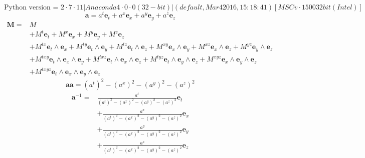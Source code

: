 \documentclass[10pt,fleqn]{report}
\begin{document}
\begin{equation*} \mbox{Python version = } 2 \cdot 7 \cdot 11 |Anaconda 4 \cdot 0 \cdot 0 (32-bit)| (default, Mar  4 2016, 15:18:41) [MSC v \cdot 1500 32 bit (Intel)] \end{equation*}
\begin{equation*} \bm{a} =  a^{t}  \boldsymbol{e}_{t} + a^{x}  \boldsymbol{e}_{x} + a^{y}  \boldsymbol{e}_{y} + a^{z}  \boldsymbol{e}_{z} \end{equation*}
  \begin{align*} \bm{M} =  & M   \\  &  + M^{t}  \boldsymbol{e}_{t} + M^{x}  \boldsymbol{e}_{x} + M^{y}  \boldsymbol{e}_{y} + M^{z}  \boldsymbol{e}_{z} \\  &  + M^{tx}  \boldsymbol{e}_{t}\wedge \boldsymbol{e}_{x} + M^{ty}  \boldsymbol{e}_{t}\wedge \boldsymbol{e}_{y} + M^{tz}  \boldsymbol{e}_{t}\wedge \boldsymbol{e}_{z} + M^{xy}  \boldsymbol{e}_{x}\wedge \boldsymbol{e}_{y} + M^{xz}  \boldsymbol{e}_{x}\wedge \boldsymbol{e}_{z} + M^{yz}  \boldsymbol{e}_{y}\wedge \boldsymbol{e}_{z} \\  &  + M^{txy}  \boldsymbol{e}_{t}\wedge \boldsymbol{e}_{x}\wedge \boldsymbol{e}_{y} + M^{txz}  \boldsymbol{e}_{t}\wedge \boldsymbol{e}_{x}\wedge \boldsymbol{e}_{z} + M^{tyz}  \boldsymbol{e}_{t}\wedge \boldsymbol{e}_{y}\wedge \boldsymbol{e}_{z} + M^{xyz}  \boldsymbol{e}_{x}\wedge \boldsymbol{e}_{y}\wedge \boldsymbol{e}_{z} \\  &  + M^{txyz}  \boldsymbol{e}_{t}\wedge \boldsymbol{e}_{x}\wedge \boldsymbol{e}_{y}\wedge \boldsymbol{e}_{z}  \end{align*} 
\begin{equation*} \bm{a} \bm{a} = {\left ( a^{t} \right ) }^{2} - {\left ( a^{x} \right ) }^{2} - {\left ( a^{y} \right ) }^{2} - {\left ( a^{z} \right ) }^{2} \end{equation*}
  \begin{align*} \bm{a}^{-1} =  & \frac{a^{t} }{{\left ( a^{t} \right ) }^{2} - {\left ( a^{x} \right ) }^{2} - {\left ( a^{y} \right ) }^{2} - {\left ( a^{z} \right ) }^{2}} \boldsymbol{e}_{t} \\  &  + \frac{a^{x} }{{\left ( a^{t} \right ) }^{2} - {\left ( a^{x} \right ) }^{2} - {\left ( a^{y} \right ) }^{2} - {\left ( a^{z} \right ) }^{2}} \boldsymbol{e}_{x} \\  &  + \frac{a^{y} }{{\left ( a^{t} \right ) }^{2} - {\left ( a^{x} \right ) }^{2} - {\left ( a^{y} \right ) }^{2} - {\left ( a^{z} \right ) }^{2}} \boldsymbol{e}_{y} \\  &  + \frac{a^{z} }{{\left ( a^{t} \right ) }^{2} - {\left ( a^{x} \right ) }^{2} - {\left ( a^{y} \right ) }^{2} - {\left ( a^{z} \right ) }^{2}} \boldsymbol{e}_{z}  \end{align*} 
\end{document}
